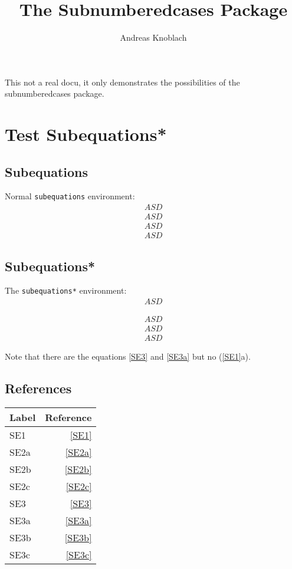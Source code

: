 \documentclass[12pt,fleqn,DIV=14]{scrartcl}
\author{Andreas Knoblach}
\title{The Subnumberedcases Package}
\numberwithin{equation}{section}
\begin{document}
\maketitle
{}
This not a real docu, it only demonstrates the possibilities of the subnumberedcases package.
\tableofcontents
\clearpage

\section{Test Subequations*}
\subsection{Subequations}
Normal \texttt{subequations} environment:
\begin{align}
	ASD\label{SE1}
\end{align}
\begin{subequations}
	\begin{align}
		ASD\label{SE2a} \\
		ASD\label{SE2b} \\
		ASD\label{SE2c} 
	\end{align}
\end{subequations}

\subsection{Subequations*}
The \texttt{subequations*} environment:
\begin{align}
	ASD\label{SE3}
\end{align}
\begin{subequations*}
	\begin{align}
		ASD\label{SE3a} \\
		ASD\label{SE3b} \\
		ASD\label{SE3c} 
	\end{align}
\end{subequations*}
Note that there are the equations \eqref{SE3} and \eqref{SE3a} but no (\ref{SE1}a).

\subsection{References}
\begin{center}
	\begin{tabular}{lr}
		\toprule
			\textbf{Label} & \textbf{Reference} \\ \midrule
			SE1  & \eqref{SE1}  \\ \midrule
			SE2a & \eqref{SE2a} \\
			SE2b & \eqref{SE2b} \\
			SE2c & \eqref{SE2c} \\ \midrule
			SE3  & \eqref{SE3}  \\ \midrule
			SE3a & \eqref{SE3a} \\
			SE3b & \eqref{SE3b} \\
			SE3c & \eqref{SE3c} \\ \bottomrule
	\end{tabular}
\end{center}
\clearpage
\end{document}
